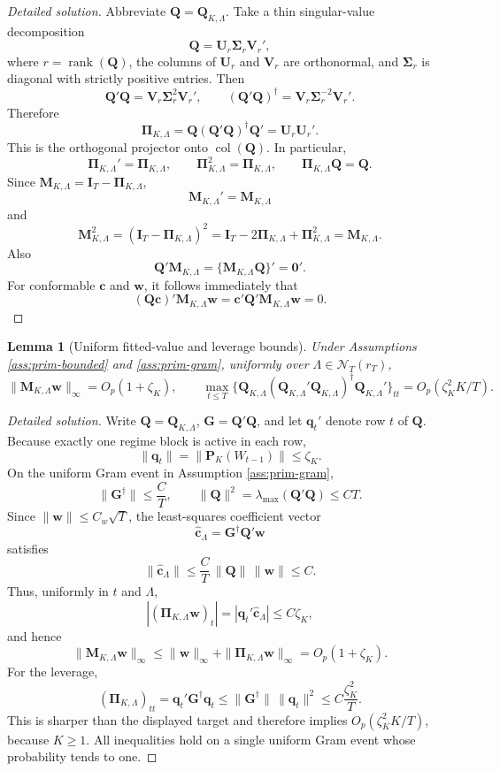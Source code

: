\documentclass[12pt]{article}
\numberwithin{equation}{section}
\newtheorem{lemma}{Lemma}
\theoremstyle{definition}
\begin{document}
\begin{proof}[Detailed solution]
Abbreviate \(\bm Q=\bm Q_{K,\Lambda}\).  Take a thin singular-value
decomposition
\[
    \bm Q=\bm U_r\bm\Sigma_r\bm V_r',
\]
where \(r=\operatorname{rank}(\bm Q)\), the columns of \(\bm U_r\) and
\(\bm V_r\) are orthonormal, and \(\bm\Sigma_r\) is diagonal with strictly
positive entries.  Then
\[
    \bm Q'\bm Q
    =\bm V_r\bm\Sigma_r^2\bm V_r',
    \qquad
    (\bm Q'\bm Q)^\dagger
    =\bm V_r\bm\Sigma_r^{-2}\bm V_r'.
\]
Therefore
\[
    \bm\Pi_{K,\Lambda}
    =\bm Q(\bm Q'\bm Q)^\dagger\bm Q'
    =\bm U_r\bm U_r'.
\]
This is the orthogonal projector onto \(\operatorname{col}(\bm Q)\).  In
particular,
\[
    \bm\Pi_{K,\Lambda}'=\bm\Pi_{K,\Lambda},
    \qquad
    \bm\Pi_{K,\Lambda}^2=\bm\Pi_{K,\Lambda},
    \qquad
    \bm\Pi_{K,\Lambda}\bm Q=\bm Q.
\]
Since \(\bm M_{K,\Lambda}=\bm I_T-\bm\Pi_{K,\Lambda}\),
\[
    \bm M_{K,\Lambda}'=\bm M_{K,\Lambda}
\]
and
\[
    \bm M_{K,\Lambda}^2
    =(\bm I_T-\bm\Pi_{K,\Lambda})^2
    =\bm I_T-2\bm\Pi_{K,\Lambda}+\bm\Pi_{K,\Lambda}^2
    =\bm M_{K,\Lambda}.
\]
Also
\[
    \bm Q'\bm M_{K,\Lambda}
    =\{\bm M_{K,\Lambda}\bm Q\}'
    =\bm0'.
\]
For conformable \(\bm c\) and \(\bm w\), it follows immediately that
\[
    (\bm Q\bm c)'\bm M_{K,\Lambda}\bm w
    =\bm c'\bm Q'\bm M_{K,\Lambda}\bm w=0.
\]
\end{proof}


\begin{lemma}[Uniform fitted-value and leverage bounds]
\label{lem:wb-leverage}
Under Assumptions \ref{ass:prim-bounded} and \ref{ass:prim-gram}, uniformly over \(\Lambda\in\mathcal N_T(r_T)\),
\[
    \|\bm M_{K,\Lambda}\bm w\|_\infty=O_p(1+\zeta_K),
    \qquad
    \max_{t\leq T}\{\bm Q_{K,\Lambda}(\bm Q_{K,\Lambda}'\bm Q_{K,\Lambda})^\dagger\bm Q_{K,\Lambda}'\}_{tt}
    =
    O_p(\zeta_K^2K/T).
\]
\end{lemma}


\begin{proof}[Detailed solution]
Write \(\bm Q=\bm Q_{K,\Lambda}\), \(\bm G=\bm Q'\bm Q\), and let
\(\bm q_t'\) denote row \(t\) of \(\bm Q\).  Because exactly one regime block
is active in each row,
\[
    \|\bm q_t\|=\|\bm P_K(W_{t-1})\|\leq\zeta_K.
\]
On the uniform Gram event in Assumption \ref{ass:prim-gram},
\[
    \|\bm G^\dagger\|\leq \frac{C}{T},
    \qquad
    \|\bm Q\|^2=\lambda_{\max}(\bm Q'\bm Q)\leq CT.
\]
Since \(\|\bm w\|\leq C_w\sqrt T\), the least-squares coefficient vector
\[
    \widehat{\bm c}_\Lambda=\bm G^\dagger\bm Q'\bm w
\]
satisfies
\[
    \|\widehat{\bm c}_\Lambda\|
    \leq \frac{C}{T}\,\|\bm Q\|\,\|\bm w\|
    \leq C.
\]
Thus, uniformly in \(t\) and \(\Lambda\),
\[
    |(\bm\Pi_{K,\Lambda}\bm w)_t|
    =|\bm q_t'\widehat{\bm c}_\Lambda|
    \leq C\zeta_K,
\]
and hence
\[
    \|\bm M_{K,\Lambda}\bm w\|_\infty
    \leq \|\bm w\|_\infty+
          \|\bm\Pi_{K,\Lambda}\bm w\|_\infty
    =O_p(1+\zeta_K).
\]
For the leverage,
\[
    (\bm\Pi_{K,\Lambda})_{tt}
    =\bm q_t'\bm G^\dagger\bm q_t
    \leq \|\bm G^\dagger\|\,\|\bm q_t\|^2
    \leq C\frac{\zeta_K^2}{T}.
\]
This is sharper than the displayed target and therefore implies
\(O_p(\zeta_K^2K/T)\), because \(K\geq1\).  All inequalities hold on a single
uniform Gram event whose probability tends to one.
\end{proof}
\end{document}
